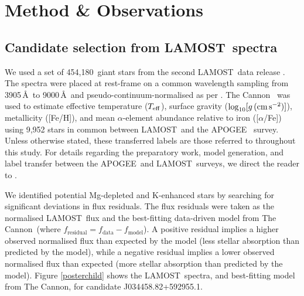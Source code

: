 \documentclass[a4paper,fleqn,usenatbib]{mnras}
\newcommand{\todo}[1]{\textcolor{red}{#1}}
\newcommand{\LamostGiants}{454,180}
\newcommand{\project}[1]{#1}
\newcommand{\lamost}{\project{LAMOST}}
\newcommand{\apogee}{\project{APOGEE}}
\newcommand{\tc}{\project{The Cannon}}
\newcommand{\teff}{T_{\rm eff}}
\newcommand{\logg}{\log_{10}[g\,({\rm cm\,s}^{-2})]}
\begin{document}
\section{Method \& Observations}
\label{sec:method}
\subsection{Candidate selection from \lamost\ spectra}
We used a set of \LamostGiants\ giant stars from the second \lamost\ data release \todo{\citep{lamostDR2}}. The spectra were placed at rest-frame on a common wavelength sampling from 3905\,\AA\ to 9000\,\AA\ and pseudo-continuum-normalised as per \citet{ho2017}. \tc\ \citep{ness2016,ho2017} was used to estimate effective temperature ($\teff$), surface gravity ($\logg$), metallicity ([Fe/H]), and mean $\alpha$-element abundance relative to iron ([$\alpha$/Fe]) using 9,952 stars in common between \lamost\ and the \apogee\ \citep{alam2015} survey. Unless otherwise stated, these transferred labels are those referred to throughout this study. For details regarding the preparatory work, model generation, and label transfer between the \apogee\ and \lamost\ surveys, we direct the reader to \citet{ho2017}. 

We identified potential Mg-depleted and K-enhanced stars by searching for significant deviations in flux residuals. The flux residuals were taken as the normalised \lamost\ flux and the best-fitting data-driven model from \tc\ (where $f_{\textrm{residual}} = f_{\textrm{data}} - f_{\textrm{model}}$). A positive residual implies a higher observed normalised flux than expected by the model (less stellar absorption than predicted by the model), while a negative residual implies a lower observed normalised flux than expected (more stellar absorption than predicted by the model). Figure \ref{posterchild} shows the \lamost\ spectra, and best-fitting model from \tc, for candidate J034458.82+592955.1.
\end{document}
